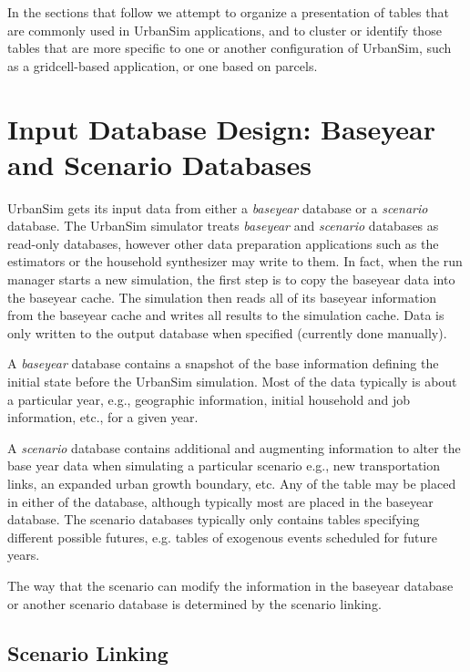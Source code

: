 In the sections that follow we attempt to organize a presentation of tables that are commonly used in UrbanSim
applications, and to cluster or identify those tables that are more specific to one or another configuration of
UrbanSim, such as a gridcell-based application, or one based on parcels.

\section{Input Database Design: Baseyear and Scenario Databases}
\label{urbansim-database-tables-baseyear-scenario-db}

UrbanSim gets its input data from either a \emph{baseyear} database or a
\emph{scenario} database.  The UrbanSim simulator treats \emph{baseyear} and
\emph{scenario} databases as read-only databases, however other data
preparation applications such as the estimators or the household synthesizer
may write to them.  In fact, when the run manager starts a new simulation, the
first step is to copy the baseyear data into the baseyear cache. \baseyearcacheindex The
simulation then reads all of its baseyear information from the baseyear cache \baseyearcacheindex
and writes all results to the simulation cache. \simulationcacheindex Data is only written to the
output database when specified (currently done manually).

A \emph{baseyear} database contains a snapshot of the base
information defining the initial state before the UrbanSim
simulation. Most of the data typically is about a particular year,
e.g., geographic information, initial household and job information,
etc., for a given year.

A \emph{scenario} database contains additional and augmenting information to
alter the base year data when simulating a particular scenario e.g., new
transportation links, an expanded urban growth boundary, etc. Any of the table
may be placed in either of the database, although typically most are placed in
the baseyear database.  The scenario databases typically only contains tables
specifying different possible futures, e.g. tables of exogenous events
scheduled for future years.

The way that the scenario can modify the information in the baseyear database or
another scenario database is determined by the scenario linking.

\subsection{Scenario Linking}

